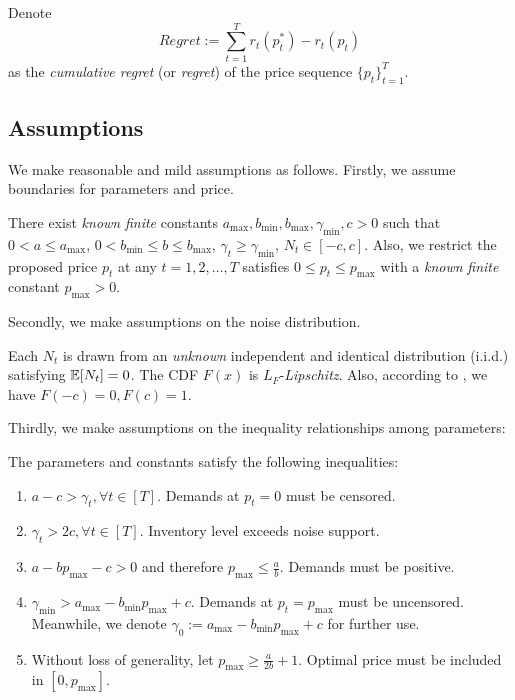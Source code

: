 \begin{definition}[Regret]
    \label{def:regret}
    Denote
    \begin{equation}
        \label{equ:regret_def}
        Regret:= \sum_{t=1}^T r_t(p_t^*)-r_t(p_t)
    \end{equation}
    as the \emph{cumulative regret} (or \emph{regret}) of the price sequence $\{p_t\}_{t=1}^T$.
\end{definition}

\subsection{Assumptions}
\label{subsec:assumptions}
We make reasonable and mild assumptions as follows. Firstly, we assume boundaries for parameters and price.

\begin{assumption}[Boundedness]
    \label{assumption:boundedness}
    There exist \emph{known} \emph{finite} constants $a_{\max}, b_{\min}, b_{ \max}, \gamma_{\min}, c >0$ such that $0<a\leq a_{\max}$, $0<b_{\min}\leq b\leq b_{\max}$, $\gamma_t\geq\gamma_{\min}$, $N_t\in[-c, c]$. Also, we restrict the proposed price $p_t$ at any $t=1,2,\ldots, T$ satisfies $0\leq p_t\leq p_{\max}$ with a \emph{known} \emph{finite} constant $p_{\max}>0$.
\end{assumption}

Secondly, we make assumptions on the noise distribution.
\begin{assumption}
    \label{assumption:noise}
    Each $N_t$ is drawn from an \emph{unknown} independent and identical distribution (i.i.d.) satisfying $\mathbb{E}[N_t] = 0$. The CDF $F(x)$ is $L_F$-\emph{Lipschitz}. Also, according to , we have $F(-c)=0, F(c)=1$.
\end{assumption}

Thirdly, we make assumptions on the inequality relationships among parameters:

\begin{assumption}
    \label{assumption:inequality}
    The parameters and constants satisfy the following inequalities:
    \begin{enumerate}
        \item $a-c > \gamma_t, \forall t\in[T]$. Demands at $p_t=0$ must be censored.
        \item $\gamma_t > 2c, \forall t\in[T]$. Inventory level exceeds noise support.
        \item $a-b p_{\max} - c > 0$ and therefore $p_{\max}\leq\frac{a}{b}$. Demands must be positive.
        \item $\gamma_{\min} > a_{\max} -b_{\min} p_{\max} + c$. Demands at $p_t=p_{\max}$ must be uncensored. Meanwhile, we denote $\gamma_0:=a_{\max} -b_{\min} p_{\max} + c$ for further use.
        \item Without loss of generality,  let $p_{\max}\geq \frac{a}{2b}+1$. Optimal price must be included in $[0, p_{\max}]$.
    \end{enumerate}
\end{assumption}

